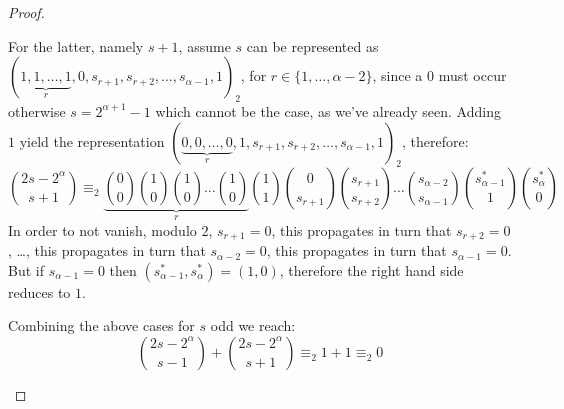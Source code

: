 \begin{proof}
\begin{itemize}
\begin{itemize}
                For the latter, namely $s+1$, assume $s$ can be represented as 
                $(\underbrace{1,1,\ldots,1}_{r},0,s_{r+1},s_{r+2},\ldots,s_{{\alpha}-1},1)_{2}$, for
                $r\in\lbrace1,\ldots,{\alpha}-2\rbrace$, since a $0$ must occur otherwise $s=2^{{\alpha}+1}-1$
                which cannot be the case, as we've already seen.  Adding $1$ yield the representation
                $(\underbrace{0,0,\ldots,0}_{r},1,s_{r+1},s_{r+2},\ldots,s_{{\alpha}-1},1)_{2}$, therefore:
                \begin{displaymath}
                    {{2s-2^{{\alpha}}}\choose{s+1}} 
                    \equiv_{2} 
                    \underbrace{
                        {{0}\choose{0}} 
                        {{1}\choose{0}}
                        {{1}\choose{0}}
                        \ldots
                        {{1}\choose{0}}
                    }_{r}
                    {{1}\choose{1}}
                    {{0}\choose{s_{r+1}}}
                    {{s_{r+1}}\choose{s_{r+2}}}
                    \ldots
                    {{s_{{\alpha}-2}}\choose{s_{{\alpha}-1}}}
                    {{s_{{\alpha}-1}^{*}}\choose{1}}
                    {{s_{{\alpha}}^{*}}\choose{0}}
                \end{displaymath}
                In order to not vanish, modulo $2$, 
                $s_{r+1}=0$, this propagates in turn that $s_{r+2}=0$, \ldots, 
                this propagates in turn that $s_{{\alpha}-2}=0$,
                this propagates in turn that $s_{{\alpha}-1}=0$. But if $s_{{\alpha}-1}=0$
                then $(s_{{\alpha}-1}^{*},s_{{\alpha}}^{*})=(1,0)$, therefore the right
                hand side reduces to $1$.

                Combining the above cases for $s$ odd we reach:
                \begin{displaymath}
                        {{2s-2^{{\alpha}}}\choose{s-1}}+{{2s-2^{{\alpha}}}\choose{s+1}} \equiv_{2} 1+1\equiv_{2} 0
                \end{displaymath}
        \end{itemize}


\end{itemize}
\end{proof}
